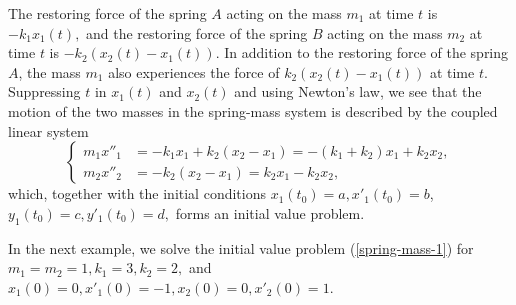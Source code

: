   The restoring force of the spring $A$ acting on the mass $m_1$ at time $t$  is  $-k_1 x_1(t),$ and the restoring force of the spring $B$  acting on the mass $m_2$ at time $t$ is  $-k_2(x_2(t)- x_1(t)).$  In addition to the restoring force of the spring $A$, the mass $m_1$ also experiences the force of $k_2(x_2(t)- x_1(t))$ at time $t$. Suppressing $t$ in $x_1(t)$ and $x_2(t)$ and using   Newton's law,
we see that the motion of the two masses in the  spring-mass system is described by the coupled linear system
 \begin{equation}\begin{cases}\label{spring-mass-1}
 	m_1x''_1 &= -k_1 x_1 + k_2 (x_2 - x_1) = -(k_1+k_2) x_1 +k_2 x_2,\\
 	m_2 x''_2 &= -k_2 (x_2 - x_1)= k_2 x_1-k_2 x_2,
 \end{cases}
 \end{equation}
which, together with the initial conditions  $x_1(t_0) = a, x'_1(t_0) = b$, $y_1(t_0) = c, y'_1(t_0) = d,$  forms an initial value problem.  

In the next example, we solve the initial value problem (\ref{spring-mass-1}) for  $ m_1=m_2=1, k_1=3,  k_2=2,$ and $x_1(0)=0, x'_1(0)=-1, x_2(0)=0, x'_2(0)=1.$


